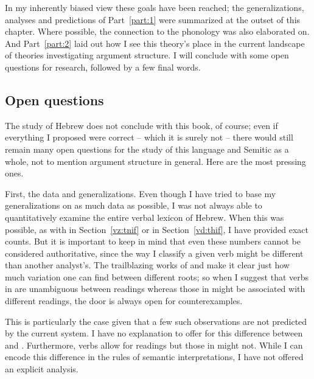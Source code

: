 \begin{exe}
\begin{xlist}
\begin{xlist}
\begin{xlist}
\begin{xlist}
\begin{xlist}
\begin{xlist}
\begin{exe}
\begin{xlist}
\begin{exe}
\begin{exe}
\begin{xlist}
\begin{exe}
\begin{exe}
\begin{xlist}
\begin{exe}
\begin{xlist}
\begin{exe}
\begin{xlist}
\begin{exe}
\begin{xlist}
\begin{exe}
\begin{xlist}
\begin{exe}
\begin{xlist}
\begin{exe}
\begin{xlist}
\begin{exe}
\begin{xlist}
\begin{exe}
\begin{xlist}
\begin{exe}
\begin{xlist}
\begin{exe}
\begin{xlist}
In my inherently biased view these goals have been reached; the generalizations, analyses and predictions of Part~\ref{part:1} were summarized at the outset of this chapter. Where possible, the connection to the phonology was also elaborated on. And Part~\ref{part:2} laid out how I see this theory's place in the current landscape of theories investigating argument structure. I will conclude with some open questions for research, followed by a few final words.

	\subsection{Open questions}
The study of Hebrew does not conclude with this book, of course; even if everything I proposed were correct -- which it is surely not -- there would still remain many open questions for the study of this language and Semitic as a whole, not to mention argument structure in general. Here are the most pressing ones.

First, the data and generalizations. Even though I have tried to base my generalizations on as much data as possible, I was not always able to quantitatively examine the entire verbal lexicon of Hebrew. When this was possible, as with {\tnif} in Section~\ref{vz:tnif} or {\thif} in Section~\ref{vd:thif}, I have provided exact counts. But it is important to keep in mind that even these numbers cannot be considered authoritative, since the way I classify a given verb might be different than another analyst's. The trailblazing works of \cite{doron03} and \cite{arad05} make it clear just how much variation one can find between different roots; so when I suggest that verbs in {\thit} are unambiguous between readings whereas those in {\tnif} might be associated with different readings, the door is always open for counterexamples.

This is particularly the case given that a few such observations are not predicted by the current system. I have no explanation to offer for this difference between {\thit} and {\tnif}. Furthermore, {\tnif} verbs allow for  readings but those in {\thit} might not. While I can encode this difference in the rules of semantic interpretations, I have not offered an explicit analysis.


\end{xlist}
\end{exe}
\end{xlist}
\end{exe}
\end{xlist}
\end{exe}
\end{xlist}
\end{exe}
\end{xlist}
\end{exe}
\end{xlist}
\end{exe}
\end{xlist}
\end{exe}
\end{xlist}
\end{exe}
\end{xlist}
\end{exe}
\end{xlist}
\end{exe}
\end{xlist}
\end{exe}
\end{exe}
\end{xlist}
\end{exe}
\end{exe}
\end{xlist}
\end{exe}
\end{xlist}
\end{xlist}
\end{xlist}
\end{xlist}
\end{xlist}
\end{xlist}
\end{exe}
